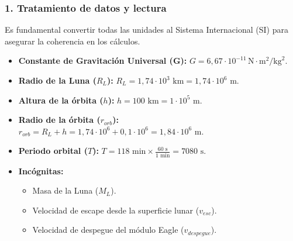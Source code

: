 \subsubsection*{1. Tratamiento de datos y lectura}
Es fundamental convertir todas las unidades al Sistema Internacional (SI) para asegurar la coherencia en los cálculos.
\begin{itemize}
    \setlength{\itemsep}{0pt}
    \setlength{\parskip}{0pt}
    \item \textbf{Constante de Gravitación Universal (G):} $G = 6,67 \cdot 10^{-11} \, \text{N}\cdot\text{m}^2/\text{kg}^2$.
    \item \textbf{Radio de la Luna ($R_L$):} $R_L = 1,74 \cdot 10^3 \text{ km} = 1,74 \cdot 10^6 \text{ m}$.
    \item \textbf{Altura de la órbita ($h$):} $h = 100 \text{ km} = 1 \cdot 10^5 \text{ m}$.
    \item \textbf{Radio de la órbita ($r_{orb}$):} $r_{orb} = R_L + h = 1,74 \cdot 10^6 + 0,1 \cdot 10^6 = 1,84 \cdot 10^6 \text{ m}$.
    \item \textbf{Periodo orbital ($T$):} $T = 118 \text{ min} \times \frac{60 \text{ s}}{1 \text{ min}} = 7080 \text{ s}$.
    \item \textbf{Incógnitas:}
    \begin{itemize}
        \setlength{\itemsep}{0pt}
        \item Masa de la Luna ($M_L$).
        \item Velocidad de escape desde la superficie lunar ($v_{esc}$).
        \item Velocidad de despegue del módulo Eagle ($v_{despegue}$).
    \end{itemize}
\end{itemize}

